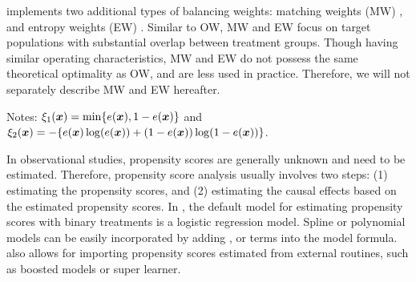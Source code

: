  implements two additional types of balancing weights: matching weights (MW) \citep{LiGreene13}, and entropy weights (EW) \citep{Zhou2020}.  Similar to OW, MW and EW focus on target populations with substantial overlap between treatment groups. Though having similar operating characteristics, MW and EW do not possess the same theoretical optimality as OW, and are less used in practice. Therefore, we will not separately describe MW and EW hereafter. 

\begin{table} 
\begin{center}
\caption{Target populations, tilting functions, estimands and the corresponding balancing weights for binary treatments in . \label{tab:weights_binary}}
{\footnotesize
\begin{threeparttable}
\begin{tablenotes}
  \small
  \item Notes: $\xi_1(\bm{x}) = \min \{e(\bm{x}),1-e(\bm{x})\}$ and $\xi_2(\bm{x})=-\{e(\bm{x})\log(e(\bm{x}))+(1-e(\bm{x}))\log(1-e(\bm{x}))\} $.
\end{tablenotes}
\end{threeparttable}}
\end{center}
\end{table}

In observational studies, propensity scores are generally unknown and need to be estimated. Therefore, propensity score analysis usually involves two steps: (1) estimating the propensity scores, and (2) estimating the causal effects based on the estimated propensity scores. In , the default model for estimating propensity scores with binary treatments is a logistic regression model. Spline or polynomial models can be easily incorporated by adding ,  or  terms into the model formula.  also allows for importing propensity scores estimated from external routines, such as boosted models or super learner. %

